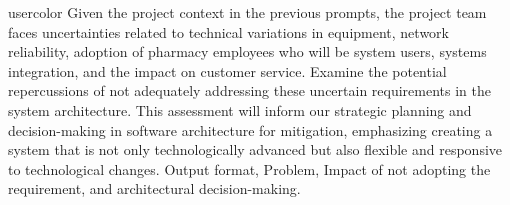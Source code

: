 
\begin{chatin}{usercolor}{}
Given the project context in the previous prompts, the project team faces uncertainties related to technical variations in equipment, network reliability, adoption of pharmacy employees who will be system users, systems integration, and the impact on customer service. Examine the potential repercussions of not adequately addressing these uncertain requirements in the system architecture. This assessment will inform our strategic planning and decision-making in software architecture for mitigation, emphasizing creating a system that is not only technologically advanced but also flexible and responsive to technological changes. Output format, Problem, Impact of not adopting the requirement, and architectural decision-making.
\end{chatin}

